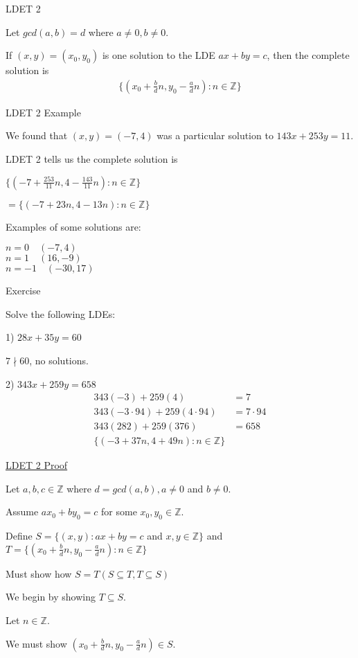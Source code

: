 \documentclass{article}
\begin{document}
LDET 2

Let $gcd(a,b) = d$ where $a \ne 0, b \ne 0$. 

If $(x,y) = (x_0, y_0)$ is one solution to the LDE $ax + by = c$, then the complete solution is 
\begin{align*}
    \{(x_0 + \frac{b}{d}n, y_0 - \frac{a}{d}n) : n \in \mathbb{Z}\}
\end{align*}

LDET 2 Example

We found that $(x,y) = (-7,4)$ was a particular solution to $143x + 253y = 11$. 

LDET 2 tells us the complete solution is 

$\{(-7 + \frac{253}{11}n, 4 - \frac{143}{11}n): n \in \mathbb{Z}\}$

$= \{(-7 + 23n, 4-13n): n \in \mathbb{Z}\}$

Examples of some solutions are:

$n = 0 \quad (-7, 4)$ \\
$n = 1 \quad (16, -9)$ \\
$n = -1 \quad (-30, 17)$

Exercise 

Solve the following LDEs: 

1) $28x + 35y = 60$

$7 \nmid 60$, no solutions. 

2) $343x + 259y = 658$
\begin{align*}
    343(-3) + 259(4) &= 7\\
    343(-3 \cdot 94) + 259(4 \cdot 94) &= 7 \cdot 94 \\
    343(282) + 259(376) &= 658 \\
    \{(-3 + 37n, 4+49n): n \in \mathbb{Z}\}
\end{align*}

\underline{LDET 2 Proof}

Let $a,b,c \in \mathbb{Z}$ where $d = gcd(a,b), a \ne 0$ and $b \ne 0$. 

Assume $ax_0 + by_0 = c$ for some $x_0, y_0 \in \mathbb{Z}$. 

Define $S = \{(x,y): ax + by = c$ and $x,y \in \mathbb{Z}\}$ and $T = \{(x_0 + \frac{b}{d}n, y_0-\frac{a}{d}n): n \in \mathbb{Z}\}$

Must show how $S = T (S \subseteq T, T \subseteq S)$

We begin by showing $T \subseteq S$. 

Let $n \in \mathbb{Z}$. 

We must show $(x_0 + \frac{b}{d}n, y_0-\frac{a}{d}n) \in S$.
\end{document}
